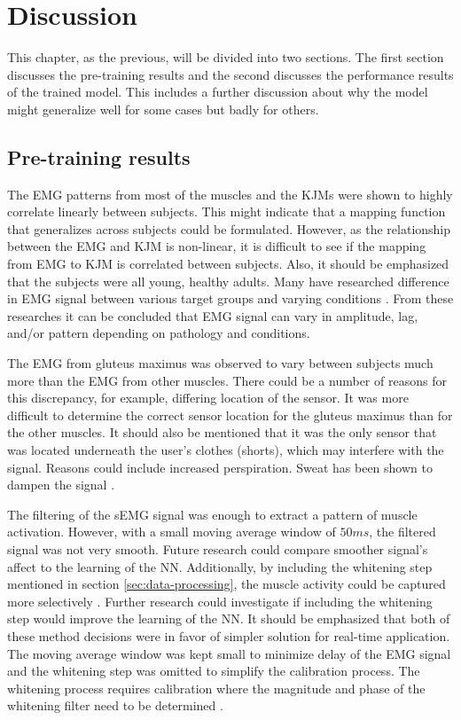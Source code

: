 \documentclass[../main.tex]{subfiles}
\begin{document}
\chapter{Discussion}
\label{sec:discussion}
This chapter, as the previous, will be divided into two sections. 
The first section discusses the pre-training results and the second discusses the performance results of the trained model.
This includes a further discussion about why the model might generalize well for some cases but badly for others.

\section{Pre-training results}
\label{sec:discussion_pre-training-results}
The \ac{EMG} patterns from most of the muscles and the \acp{KJM} were shown to highly correlate linearly between subjects.
This might indicate that a mapping function that generalizes across subjects could be formulated.
However, as the relationship between the \ac{EMG} and \ac{KJM} is non-linear, it is difficult to see if the mapping from \ac{EMG} to \ac{KJM} is correlated between subjects.
Also, it should be emphasized that the subjects were all young, healthy adults.
Many have researched difference in \ac{EMG} signal between various target groups and varying conditions \cite{Courtine2003,Rezgui2013,Sacco2010, Zwaan2012}.
From these researches it can be concluded that \ac{EMG} signal can vary in amplitude, lag, and/or pattern depending on pathology and conditions.

The \ac{EMG} from gluteus maximus was observed to vary between subjects much more than the \ac{EMG} from other muscles.
There could be a number of reasons for this discrepancy, for example, differing location of the sensor.
It was more difficult to determine the correct sensor location for the gluteus maximus than for the other muscles.
It should also be mentioned that it was the only sensor that was located underneath the user's clothes (shorts), which may interfere with the signal.
Reasons could include increased perspiration. 
Sweat has been shown to dampen the signal \cite{Abdoli-Eramaki2012}.

The filtering of the \ac{sEMG} signal was enough to extract a pattern of muscle activation.
However, with a small moving average window of $50ms$, the filtered signal was not very smooth.
Future research could compare smoother signal's affect to the learning of the \ac{NN}.
Additionally, by including the whitening step mentioned in section \ref{sec:data-processing}, the muscle activity could be captured more selectively \cite{Clancy2016}.
Further research could investigate if including the whitening step would improve the learning of the \ac{NN}.
It should be emphasized that both of these method decisions were in favor of simpler solution for real-time application.
The moving average window was kept small to minimize delay of the \ac{EMG} signal and the whitening step was omitted to simplify the calibration process.
The whitening process requires calibration where the magnitude and phase of the whitening filter need to be determined \cite{Clancy2016}.
\end{document}
